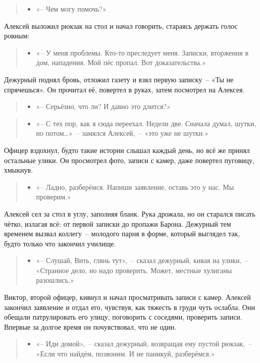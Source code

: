 \documentclass[12pt,a4paper]{book}
\newenvironment{dialogue}{\begin{quote}\itshape\begin{itemize}\item[]}{\end{itemize}\end{quote}}
\begin{document}
\begin{dialogue}
«-- Чем могу помочь?»
\end{dialogue}

Алексей выложил рюкзак на стол и начал говорить, стараясь держать голос ровным:

\begin{dialogue}
«-- У меня проблемы. Кто-то преследует меня. Записки, вторжения в дом, нападения. Мой пёс пропал. Вот доказательства.»
\end{dialogue}

Дежурный поднял бровь, отложил газету и взял первую записку~-- «Ты не спрячешься». Он прочитал её, повертел в руках, затем посмотрел на Алексея.

\begin{dialogue}
«-- Серьёзно, что ли? И давно это длится?»
\end{dialogue}

\begin{dialogue}
«-- С тех пор, как я сюда переехал. Недели две. Сначала думал, шутки, но потом\ldots»~-- замялся Алексей,~-- «это уже не шутки.»
\end{dialogue}

Офицер вздохнул, будто такие истории слышал каждый день, но всё же принял остальные улики. Он просмотрел фото, записи с камер, даже повертел пуговицу, хмыкнув.

\begin{dialogue}
«-- Ладно, разберёмся. Напиши заявление, оставь это у нас. Мы проверим.»
\end{dialogue}

Алексей сел за стол в углу, заполняя бланк. Рука дрожала, но он старался писать чётко, излагая всё: от первой записки до пропажи Барона. Дежурный тем временем вызвал коллегу~-- молодого парня в форме, который выглядел так, будто только что закончил училище.

\begin{dialogue}
«-- Слушай, Вить, глянь тут»,~-- сказал дежурный, кивая на улики,~-- «Странное дело, но надо проверить. Может, местные хулиганы разошлись.»
\end{dialogue}

Виктор, второй офицер, кивнул и начал просматривать записи с камер. Алексей закончил заявление и отдал его, чувствуя, как тяжесть в груди чуть ослабла. Они обещали патрулировать его улицу, поговорить с соседями, проверить записи. Впервые за долгое время он почувствовал, что не один.

\begin{dialogue}
«-- Иди домой»,~-- сказал дежурный, возвращая ему пустой рюкзак,~-- «Если что найдём, позвоним. И не паникуй, разберёмся.»
\end{dialogue}
\end{document}
